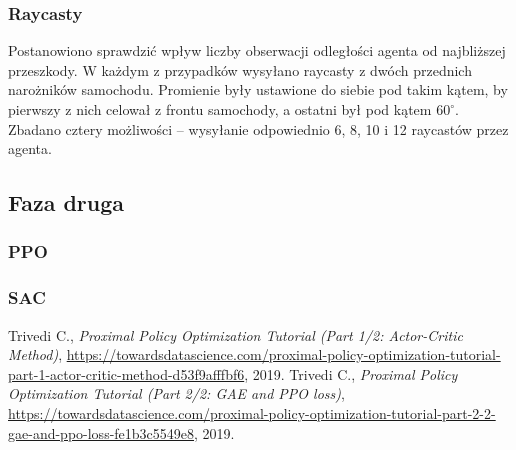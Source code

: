 \documentclass[a4paper,12pt]{article}
\begin{document}
\subsubsection{Raycasty}
Postanowiono sprawdzić wpływ liczby obserwacji odległości agenta od najbliższej przeszkody. W każdym z przypadków wysyłano raycasty z dwóch przednich narożników samochodu. Promienie były ustawione do siebie pod takim kątem, by pierwszy z nich celował z frontu samochody, a ostatni był pod kątem $60^{\circ}$. Zbadano cztery możliwości -- wysyłanie odpowiednio 6, 8, 10 i 12 raycastów przez agenta.

\subsection{Faza druga}
\subsubsection{PPO}
\subsubsection{SAC}


\begin{thebibliography}{20}
	 Trivedi C., \textit{Proximal Policy Optimization Tutorial (Part 1/2: Actor-Critic Method)}, \url{https://towardsdatascience.com/proximal-policy-optimization-tutorial-part-1-actor-critic-method-d53f9afffbf6}, 2019.
	 Trivedi C., \textit{Proximal Policy Optimization Tutorial (Part 2/2: GAE and PPO loss)}, \url{https://towardsdatascience.com/proximal-policy-optimization-tutorial-part-2-2-gae-and-ppo-loss-fe1b3c5549e8}, 2019.
\end{thebibliography}
\end{document}
